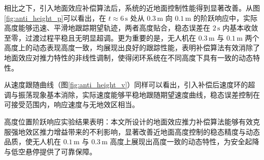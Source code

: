相比之下，引入地面效应补偿算法后，系统的近地面控制性能得到显著改善。从图\ref{fig:anti_height_p}可以看出，在 $t \approx 6\,\mathrm{s}$ 处从 $0.3\,\mathrm{m}$ 向 $0.1\,\mathrm{m}$ 的阶跃响应中，实际高度能够迅速、平滑地跟踪期望轨迹，两者高度贴合，稳态误差在 $2\,\mathrm{s}$ 内基本收敛至零，过渡过程平稳且无明显超调。更为重要的是，无人机在 $0.3\,\mathrm{m}$ 与 $0.1\,\mathrm{m}$ 两个高度上的动态表现高度一致，均展现出良好的跟踪性能，表明补偿算法有效消除了地面效应对推力特性的非线性调制，使得闭环系统在不同高度下具有一致的动态特性。

从速度跟随曲线（图\ref{fig:anti_height_v}）同样可以看出，引入补偿后速度环的超调与振荡现象基本消除，实际速度能够平稳地跟随期望速度曲线，稳态误差控制在可接受范围内，响应速度与无地效区相当。

高度位置阶跃响应实验结果表明：本文所设计的地面效应推力补偿算法能够有效克服强地效区推力增益带来的不利影响，显著改善近地面高度控制的稳态精度与动态品质，使无人机在 $0.1\,\mathrm{m}$ 与 $0.3\,\mathrm{m}$ 高度上展现出高度一致的动态特性，为安全起降与低空悬停提供了可靠保障。



